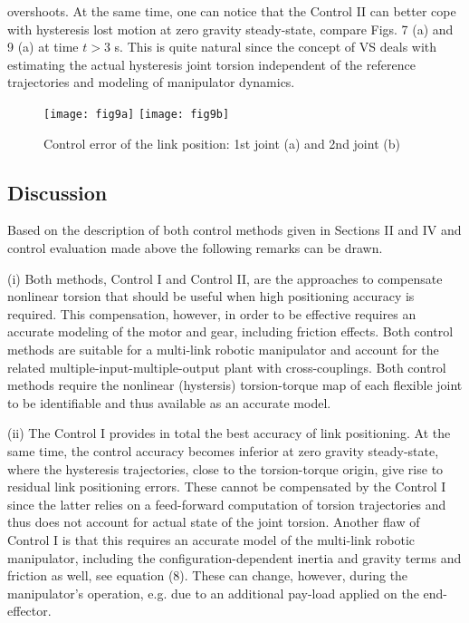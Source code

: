 \documentclass[a4paper, 10pt, conference]{ieeeconf}
\begin{document}
overshoots. At the same time, one can notice that the Control II
can better cope with hysteresis lost motion at zero gravity
steady-state, compare Figs. 7 (a) and 9 (a) at time $t > 3$ s.
This is quite natural since the concept of VS deals with
estimating the actual hysteresis joint torsion independent of the
reference trajectories and modeling of manipulator dynamics.
\begin{figure}[!h]
\centering
\texttt{[image: fig9a]}
\texttt{[image: fig9b]}
\caption{Control error of the link position: 1st joint (a) and 2nd
joint (b)} \label{fig:control2error}
\end{figure}




\subsection*{Discussion} \label{sec:6:3}


Based on the description of both control methods given in Sections
II and IV and control evaluation made above the following remarks
can be drawn.

(i) Both methods, Control I and Control II, are the approaches to
compensate nonlinear torsion that should be useful when high
positioning accuracy is required. This compensation, however, in
order to be effective requires an accurate modeling of the motor
and gear, including friction effects. Both control methods are
suitable for a multi-link robotic manipulator and account for the
related multiple-input-multiple-output plant with cross-couplings.
Both control methods require the nonlinear (hystersis)
torsion-torque map of each flexible joint to be identifiable and
thus available as an accurate model.

(ii) The Control I provides in total the best accuracy of link
positioning. At the same time, the control accuracy becomes
inferior at zero gravity steady-state, where the hysteresis
trajectories, close to the torsion-torque origin, give rise to
residual link positioning errors. These cannot be compensated by
the Control I since the latter relies on a feed-forward
computation of torsion trajectories and thus does not account for
actual state of the joint torsion. Another flaw of Control I is
that this requires an accurate model of the multi-link robotic
manipulator, including the configuration-dependent inertia and
gravity terms and friction as well, see equation (8). These can
change, however, during the manipulator's operation, e.g. due to
an additional pay-load applied on the end-effector.
\end{document}
